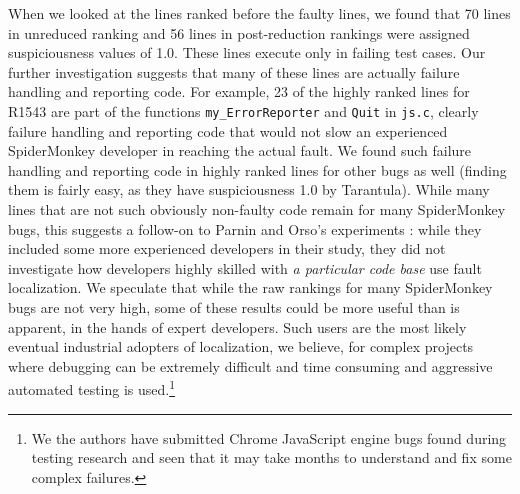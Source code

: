 When we looked at the lines ranked before the faulty lines, we found
that 70 lines in unreduced ranking and 56 lines in post-reduction
rankings were assigned suspiciousness values of 1.0. These lines
execute only in failing test cases. Our further investigation suggests
that many of these lines are actually failure handling and reporting
code.  For example, 23 of the highly ranked lines for R1543 are part
of the functions {\tt my\_ErrorReporter} and {\tt Quit} in {\tt js.c},
clearly failure handling and reporting code that would not slow an
experienced SpiderMonkey developer in reaching the actual fault.  We
found such failure handling and reporting code in highly ranked lines
for other bugs as well (finding them is fairly easy, as they have
suspiciousness 1.0 by Tarantula).  While many lines that are not such
obviously non-faulty code remain for many SpiderMonkey bugs, this
suggests a follow-on to Parnin and Orso's experiments \cite{AutoHelp}:
while they included some more experienced developers in their study,
they did not investigate how developers highly skilled with \emph{a
particular code base} use fault localization.  We speculate that while
the raw rankings for many SpiderMonkey bugs are not very high, some of
these results could be more useful than is apparent, in the hands of
expert developers.  Such users are the most likely eventual industrial
adopters of localization, we believe, for complex projects where
debugging can be extremely difficult and time consuming and aggressive
automated testing is used.\footnote{We the authors have submitted
Chrome JavaScript engine bugs found during testing research and seen
that it may take months to understand and fix some complex failures.}
